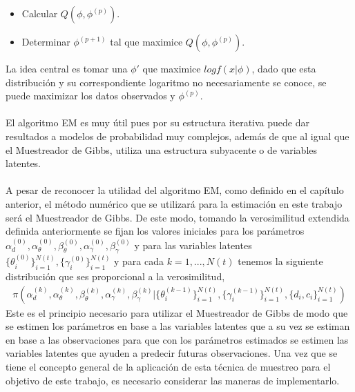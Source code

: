 \begin{itemize}
\item Calcular $Q(\phi,\phi^{(p)})$.
\item Determinar $\phi^{(p+1)}$ tal que maximice $Q(\phi,\phi^{(p)})$.
\end{itemize}
La idea central es tomar una $\phi'$ que maximice $log f(x|\phi)$, dado que esta distribuci\'on y su correspondiente logaritmo no necesariamente se conoce, se puede maximizar los datos observados y $\phi^{(p)}$.\\
\\
El algoritmo EM es muy \'util pues por su estructura iterativa puede dar resultados a modelos de probabilidad muy complejos, adem\'as de que al igual que el Muestreador de Gibbs, utiliza una estructura subyacente o de variables latentes.\\
\\
A pesar de reconocer la utilidad del algoritmo EM, como definido en el cap\'itulo anterior, el m\'etodo num\'erico que se utilizar\'a para la estimaci\'on en este trabajo ser\'a el Muestreador de Gibbs. De este modo, tomando la verosimilitud extendida definida anteriormente se fijan los valores iniciales para los par\'ametros $\alpha_d^{(0)},\alpha_\theta^{(0)},\beta_\theta^{(0)},\alpha_\gamma^{(0)},\beta_\gamma^{(0)}$ y para las variables latentes $\{\theta_i^{(0)}\}_{i=1}^{N(t)},\{\gamma_i^{(0)}\}_{i=1}^{N(t)}$ y para cada $k=1,...,N(t)$ tenemos la siguiente distribuci\'on que ses proporcional a la verosimilitud,
\begin{align*}
\pi(\alpha_d^{(k)},\alpha_\theta^{(k)},\beta_\theta^{(k)},\alpha_\gamma^{(k)},\beta_\gamma^{(k)}|\{\theta_i^{(k-1)}\}_{i=1}^{N(t)},\{\gamma_i^{(k-1)}\}_{i=1}^{N(t)},\{d_i,c_i\}_{i=1}^{N(t)})
\end{align*}
Este es el principio necesario para utilizar el Muestreador de Gibbs de modo que se estimen los par\'ametros en base a las variables latentes que a su vez se estiman en base a las observaciones para que con los par\'ametros estimados se estimen las variables latentes que ayuden a predecir futuras observaciones. Una vez que se tiene el concepto general de la aplicaci\'on de esta t\'ecnica de muestreo para el objetivo de este trabajo, es necesario considerar las maneras de implementarlo.\\